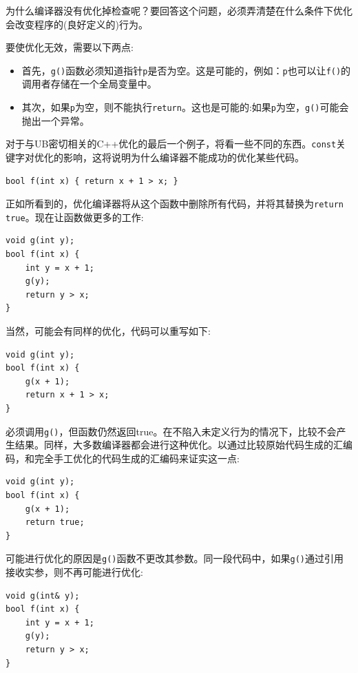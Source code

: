 为什么编译器没有优化掉检查呢？要回答这个问题，必须弄清楚在什么条件下优化会改变程序的(良好定义的)行为。

要使优化无效，需要以下两点:

\begin{itemize}
\item 
首先，\texttt{g()}函数必须知道指针\texttt{p}是否为空。这是可能的，例如：\texttt{p}也可以让\texttt{f()}的调用者存储在一个全局变量中。

\item 
其次，如果\texttt{p}为空，则不能执行\texttt{return}。这也是可能的:如果\texttt{p}为空，\texttt{g()}可能会抛出一个异常。
\end{itemize}

对于与UB密切相关的C++优化的最后一个例子，将看一些不同的东西。\texttt{const}关键字对优化的影响，这将说明为什么编译器不能成功的优化某些代码。

\begin{lstlisting}[style=styleCXX]
bool f(int x) { return x + 1 > x; }
\end{lstlisting}

正如所看到的，优化编译器将从这个函数中删除所有代码，并将其替换为\texttt{return true}。现在让函数做更多的工作:

\begin{lstlisting}[style=styleCXX]
void g(int y);
bool f(int x) {
	int y = x + 1;
	g(y);
	return y > x;
}
\end{lstlisting}

当然，可能会有同样的优化，代码可以重写如下:

\begin{lstlisting}[style=styleCXX]
void g(int y);
bool f(int x) {
	g(x + 1);
	return x + 1 > x;
}
\end{lstlisting}

必须调用\texttt{g()}，但函数仍然返回true。在不陷入未定义行为的情况下，比较不会产生结果。同样，大多数编译器都会进行这种优化。以通过比较原始代码生成的汇编码，和完全手工优化的代码生成的汇编码来证实这一点:

\begin{lstlisting}[style=styleCXX]
void g(int y);
bool f(int x) {
	g(x + 1);
	return true;
}
\end{lstlisting}

可能进行优化的原因是\texttt{g()}函数不更改其参数。同一段代码中，如果\texttt{g()}通过引用接收实参，则不再可能进行优化:

\begin{lstlisting}[style=styleCXX]
void g(int& y);
bool f(int x) {
	int y = x + 1;
	g(y);
	return y > x;
}
\end{lstlisting}

